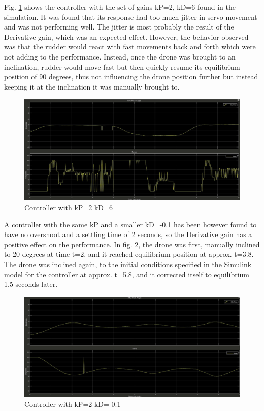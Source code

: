  Fig. \ref{fig:Controller with kP=2 kD=6} shows the controller with the set of gains kP=2, kD=6 found in the simulation. It was found that its response had too much jitter in servo movement and was not performing well. The jitter is most probably the result of the Derivative gain, which was an expected effect. However, the behavior observed was that the rudder would react with fast movements back and forth which were not adding to the performance. Instead, once the drone was brought to an inclination, rudder would move fast but then quickly resume its equilibrium position of 90 degrees, thus not influencing the drone position further but instead keeping it at the inclination it was manually brought to. 


\begin{figure}[H]
    \centering
    \includegraphics[scale=0.25]{graphics/Control/p2d6_Moment(3).jpg}
    \caption{Controller with kP=2 kD=6}
     \label{fig:Controller with kP=2 kD=6}
\end{figure} 

A controller with the same kP and a smaller kD=-0.1 has been however found to have no overshoot and a settling time of 2 seconds, so the Derivative gain has a positive effect on the performance. In fig. \ref{fig:Controller with kP=2 kD=-0.1}, the drone was first, manually inclined to 20 degrees at time t=2, and it reached equilibrium position at approx. t=3.8. The drone was inclined again, to the initial conditions specified in the Simulink model for the controller at approx. t=5.8, and it corrected itself to equilibrium 1.5 seconds later.

\begin{figure}[H]
    \centering
    \includegraphics[scale=0.25]{graphics/Control/p2dminus01_Moment.jpg}
    \caption{Controller with kP=2 kD=-0.1}
     \label{fig:Controller with kP=2 kD=-0.1}
\end{figure} 

